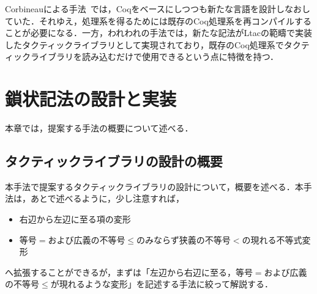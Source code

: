 \documentclass[submit]{ipsj}
\begin{document}
Corbineauによる手法~\cite{10.1007/978-3-540-68103-8_5}では，Coqをベースにしつつも新たな言語を設計しなおしていた．それゆえ，処理系を得るためには既存のCoq処理系を再コンパイルすることが必要になる．一方，われわれの手法では，新たな記法がLtacの範疇で実装したタクティックライブラリとして実現されており，既存のCoq処理系でタクティックライブラリを読み込むだけで使用できるという点に特徴を持つ．

\section{鎖状記法の設計と実装}

本章では，提案する手法の概要について述べる．

\subsection{タクティックライブラリの設計の概要}

本手法で提案するタクティックライブラリの設計について，概要を述べる．本手法は，あとで述べるように，少し注意すれば，
\begin{itemize}
\item 右辺から左辺に至る項の変形
\item 等号$=$および広義の不等号$\leq$のみならず狭義の不等号$<$の現れる不等式変形
\end{itemize}
へ拡張することができるが，まずは「左辺から右辺に至る，等号$=$および広義の不等号$\leq$が現れるような変形」を記述する手法に絞って解説する．
\end{document}
